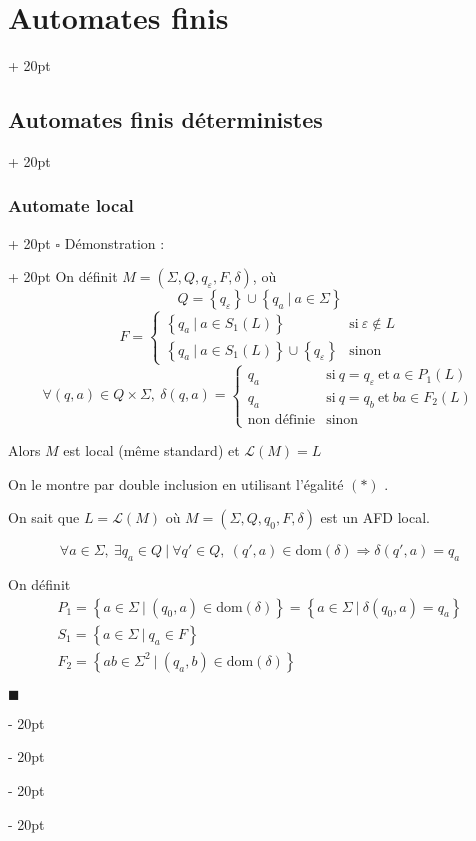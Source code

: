 \documentclass[a4paper, 12pt, twoside]{article}
\newcommand{\set}[1]{\left\{ #1 \right\}}
\newcommand{\ind}[1][20pt]{\advance\leftskip + #1}
\newcommand{\deind}[1][20pt]{\advance\leftskip - #1}
\newenvironment{indt}[2][20pt]{#2 \par \ind[#1]}{\par \deind} %
\newenvironment{proof}[1][{Démonstration :}]{\begin{indt}{$\square$ #1}}{$\blacksquare$ \end{indt}}
\begin{document}
\begin{indt}{\section{Automates finis}}
\begin{indt}{\subsection{Automates finis déterministes}}
\begin{indt}{\subsubsection{Automate local}}
\begin{proof}
                On définit $M = (\Sigma, Q, q_\varepsilon, F, \delta)$, où
                \[
                    Q = \set{q_\varepsilon} \cup \set{q_a\ |\ a \in \Sigma}
                \]
                \[
                    F =
                    \begin{cases}
                        \set{q_a\ |\ a \in S_1(L)}
                        & \text{si}\ \varepsilon \notin L
                        \\
                        \set{q_a\ |\ a \in S_1(L)} \cup \set{q_\varepsilon}
                        & \text{sinon}
                    \end{cases}
                \]
                \[
                    \forall (q ,a) \in Q \times \Sigma,\
                    \delta(q, a) =
                    \begin{cases}
                        q_a
                        & \text{si}\ q = q_\varepsilon\ \text{et}\ a \in P_1(L)
                        \\
                        q_a
                        & \text{si}\ q = q_b\ \text{et}\ ba \in F_2(L)
                        \\
                        \text{non définie}
                        & \text{sinon}
                    \end{cases}
                \]

                Alors $M$ est local (même standard) et $\mathcal L(M) = L$

                On le montre par double inclusion en utilisant l'égalité $(*)$ .

                \vspace{12pt}
                
                \boxed{\Leftarrow} On sait que $L = \mathcal L(M)$ où $M = (\Sigma, Q, q_0, F, \delta)$ est un AFD local.

                \[
                    \forall a \in \Sigma,\ \exists q_a \in Q\ |\ \forall q' \in Q,\
                    (q', a) \in \mathrm{dom}(\delta) \Rightarrow \delta(q', a) = q_a
                \]

                On définit
                \[
                    \begin{array}{l}
                        P_1 = \set{a \in \Sigma\ |\ (q_0, a) \in \mathrm{dom}(\delta)}
                        = \set{a \in \Sigma\ |\ \delta(q_0, a) = q_a}
                        \\
                        S_1 = \set{a \in \Sigma\ |\ q_a \in F}
                        \\
                        F_2 = \set{ab \in \Sigma^2\ |\ (q_a, b) \in \mathrm{dom}(\delta)}
                    \end{array}
                \]


\end{proof}
\end{indt}
\end{indt}
\end{indt}
\end{document}
